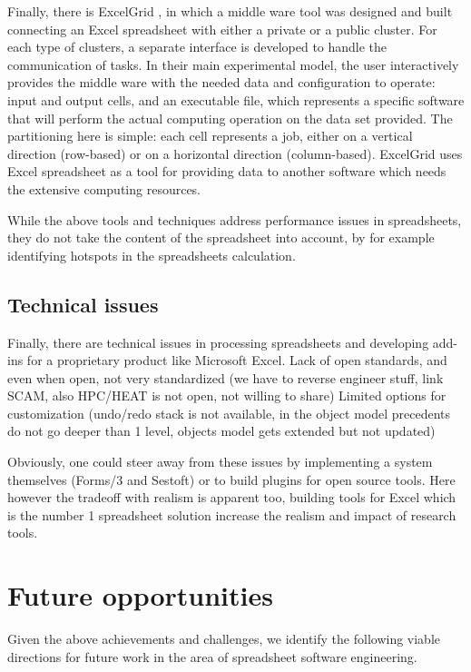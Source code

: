 \documentclass[conference]{IEEEtran}
\begin{document}
Finally, there is ExcelGrid \cite{10_nadiminti_chiu_teoh_luther_venugopal_buyya_2004}, in which a middle ware tool was designed and built connecting an Excel spreadsheet with either a private or a public cluster. For each type of clusters, a separate interface is developed to handle the communication of tasks. In their main experimental model, the user interactively provides the middle ware with the needed data and configuration to operate: input and output cells, and an executable file, which represents a specific software that will perform the actual computing operation on the data set provided. The partitioning here is simple: each cell represents a job, either on a vertical direction (row-based) or on a horizontal direction (column-based). ExcelGrid uses Excel spreadsheet as a tool for providing data to another software which needs the extensive computing resources. 

While the above tools and techniques address performance issues in spreadsheets, they do not take the content of the spreadsheet into account, by for example identifying hotspots in the spreadsheets calculation. 

\subsection{Technical issues} 
Finally, there are technical issues in processing spreadsheets and developing add-ins for a proprietary product like Microsoft Excel. 
Lack of open standards, and even when open, not very standardized (we have to reverse engineer stuff, link SCAM, also HPC/HEAT is not open, not willing to share)
Limited options for customization (undo/redo stack is not available, in the object model precedents do not go deeper than 1 level, objects model gets extended but not updated)

Obviously, one could steer away from these issues by implementing a system themselves (Forms/3 and Sestoft) or to build plugins for open source tools. Here however the tradeoff with realism is apparent too, building tools for Excel which is the number 1 spreadsheet solution increase the realism and impact of research tools.

\section{Future opportunities}
Given the above achievements and challenges, we identify the following viable directions for future work in the area of spreadsheet software engineering.
\end{document}
